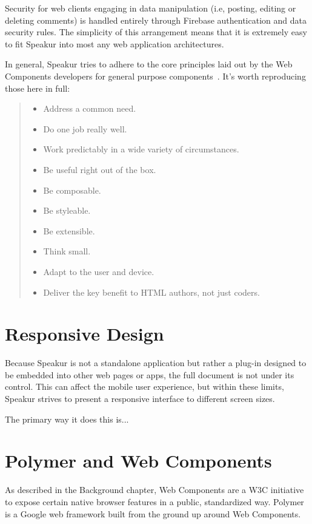 Security for web clients engaging in data manipulation (i.e, posting, editing or deleting comments) is handled entirely through Firebase authentication and data security rules.
The simplicity of this arrangement means that it is extremely easy to fit Speakur into most any web application architectures.

In general, Speakur tries to adhere to the core principles laid out by the 
Web Components developers 
for general purpose components~\cite{webcomponentscontributors2014}. 
It's worth reproducing those here in full:
\begin{quote}
\begin{itemize}
\item Address a common need.
\item Do one job really well.
\item Work predictably in a wide variety of circumstances.
\item Be useful right out of the box.
\item Be composable.
\item Be styleable.
\item Be extensible.
\item Think small.
\item Adapt to the user and device.
\item Deliver the key benefit to HTML authors, not just coders.
\end{itemize}
\end{quote}

\section{Responsive Design}
Because Speakur is not a standalone application but rather a plug-in designed to be embedded into other web pages or apps, 
the full document is not under its control.
This can affect the mobile user experience,
but within these limits, Speakur strives to present a responsive interface to different screen sizes.

The primary way it does this is...

\section{Polymer and Web Components}
As described in the Background chapter, Web Components are a W3C initiative to expose certain native browser features in a public, standardized way. 
Polymer is a Google web framework built from the ground up around Web Components.

